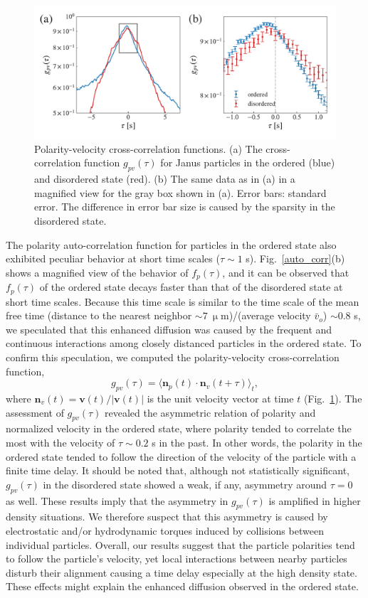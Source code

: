 \documentclass[%
 reprint,
 amsmath,amssymb,
 aps,
 floatfix
]{revtex4-2}
\newcommand{\mum}{\upmu\textrm{m}}
\begin{document}
\begin{figure}[b!]
\includegraphics[width=\columnwidth]{cross_corr2.pdf}
\caption{\label{cross_corr} Polarity-velocity cross-correlation functions. 
(a) The cross-correlation function $g_{pv}(\tau)$ for Janus particles in the ordered (blue) and disordered state (red). 
(b) The same data as in (a) in a magnified view for the gray box shown in (a).
Error bars: standard error. 
The difference in error bar size is caused by the sparsity in the disordered state.}
\end{figure} 


The polarity auto-correlation function for particles in the ordered state also exhibited peculiar behavior at short time scales ($\tau\sim 1$ s).
Fig.~\ref{auto_corr}(b) shows a magnified view of the behavior of $f_p(\tau)$, and it can be observed that $f_p(\tau)$ of the ordered state decays faster than that of the disordered state at short time scales.
Because this time scale is similar to the time scale of the mean free time (distance to the nearest neighbor $\sim 7~\mum$)/(average velocity $\bar{v}_o$) $\sim 0.8$ s, we speculated that this enhanced diffusion was caused by the frequent and continuous interactions among closely distanced particles in the ordered state.
To confirm this speculation, we computed the polarity-velocity cross-correlation function,
\begin{equation}
g_{pv}(\tau) = \langle\bm{n}_p(t)\cdot\bm{n}_v(t+\tau)\rangle_t,
\end{equation}
where $\bm{n}_v(t)= \bm{v}(t)/\left|\bm{v}(t)\right|$ is the unit velocity vector at time $t$ (Fig.~\ref{cross_corr}).
The assessment of $g_{pv}(\tau)$ revealed the asymmetric relation of polarity and normalized velocity in the ordered state, where polarity tended to correlate the most with the velocity of $\tau \sim 0.2$ s in the past.
In other words, the polarity in the ordered state tended to follow the direction of the velocity of the particle with a finite time delay.
It should be noted that, although not statistically significant, $g_{pv}(\tau)$ in the disordered state showed a weak, if any, asymmetry around $\tau=0$ as well. 
These results imply that the asymmetry in $g_{pv}(\tau)$ is amplified in higher density situations.
We therefore suspect that this asymmetry is caused by electrostatic and/or hydrodynamic torques 
induced by collisions between individual particles. 
Overall, our results suggest that the particle polarities tend to follow the particle's velocity, yet local interactions between nearby particles disturb their alignment causing a time delay especially at the high density state. These effects might explain the enhanced diffusion observed in the ordered state.
\end{document}
